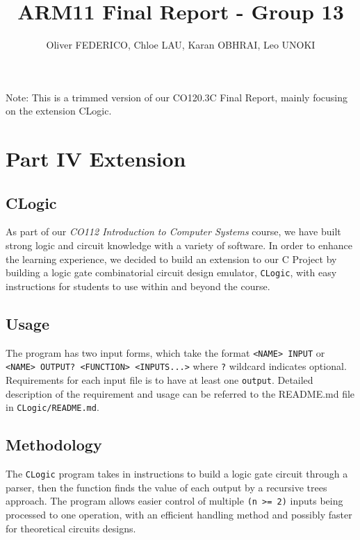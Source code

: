 \documentclass[11pt]{article}
\begin{document}
\title{\vspace{-1cm}ARM11 Final Report - Group 13}
\author{\small Oliver FEDERICO, Chloe LAU, Karan OBHRAI, Leo UNOKI}
\maketitle
Note: This is a trimmed version of our CO120.3C Final Report, mainly focusing on the extension CLogic.

\section{Part IV Extension}

\subsection{CLogic}

As part of our \textit{CO112 Introduction to Computer Systems} course, we have built strong logic and circuit knowledge with a variety of software. In order to enhance the learning experience, we decided to build an extension to our C Project by building a logic gate combinatorial circuit design emulator, \texttt{CLogic}, with easy instructions for students to use within and beyond the course.

\subsection{Usage}

The program has two input forms, which take the format \texttt{<NAME> INPUT} or \texttt{<NAME> OUTPUT? <FUNCTION> <INPUTS...>} where \texttt{?} wildcard indicates optional. Requirements for each input file is to have at least one \texttt{output}. Detailed description of the requirement and usage can be referred to the README.md file in \texttt{CLogic/README.md}.

\subsection{Methodology}

The \texttt{CLogic} program takes in instructions to build a logic gate circuit through a parser, then the function finds the value of each output by a recursive trees approach. The program allows easier control of multiple \texttt{(n >= 2)} inputs being processed to one operation, with an efficient handling method and possibly faster for theoretical circuits designs.
\end{document}
